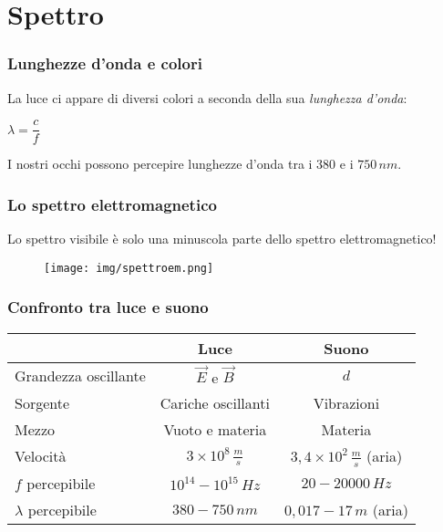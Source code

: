 \documentclass[]{beamer}
\theoremstyle{plain}
\begin{document}





\section{Spettro}

\begin{frame}
\frametitle{Lunghezze d'onda e colori}
La luce ci appare di diversi colori a seconda della sua \emph{lunghezza d'onda}:
\begin{center}
$ \lambda = \dfrac{c}{f} $
\end{center}\pause
I nostri occhi possono percepire lunghezze d'onda tra i $ 380 $ e i $ 750 \, nm $.
\end{frame}


\begin{frame}
\frametitle{Lo spettro elettromagnetico}
Lo spettro visibile è solo una minuscola parte dello spettro elettromagnetico!
  \begin{figure}
  \texttt{[image: img/spettroem.png]}
  \end{figure}
\end{frame}






\begin{frame}
\frametitle{Confronto tra luce e suono}


\centering
  \begin{tabular}{l|c|c}
    & \textbf{Luce} & \textbf{Suono} \\\hline\rule{0pt}{3ex}
    Grandezza oscillante & $ \vec{E} $ e $ \vec{B} $ & $ d $ \\\rule{0pt}{3ex}
    Sorgente & Cariche oscillanti & Vibrazioni \\\rule{0pt}{3ex}
    Mezzo & Vuoto e materia & Materia \\\rule{0pt}{3ex}
    Velocità & $ 3 \times 10^8 \,\frac{m}{s} $ & $ 3,4 \times 10^2 \, \frac{m}{s} $ (aria)\\\rule{0pt}{3ex}
    $ f $ percepibile & $ 10^{14} - 10^{15}\, Hz $ & $ 20 - 20000 \, Hz $ \\\rule{0pt}{3ex}
    $ \lambda $ percepibile & $ 380-750 \, nm $ & $ 0,017 - 17 \, m $ (aria)\\
  \end{tabular}
\end{frame}
\end{document}
